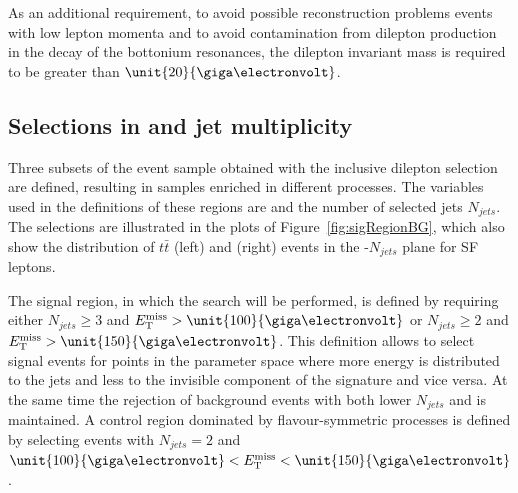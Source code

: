 As an additional requirement, to avoid possible reconstruction problems events with low lepton momenta and to avoid contamination from dilepton production in the decay of the bottonium resonances, the dilepton invariant mass \mll is required to be greater than $\unit{20}{\giga\electronvolt}$. 


\subsection{Selections in \MET and jet multiplicity}
\label{sec:regions}
Three subsets of the event sample obtained with the inclusive dilepton selection are defined, resulting in samples enriched in different processes. The variables used in the definitions of these regions are \MET and the number of selected jets $N_{jets}$. The selections are illustrated in the plots of Figure~\ref{fig:sigRegionBG}, which also show the distribution of $t\bar{t}$ (left) and \Zjets (right) events in the \MET-$N_{jets}$ plane for SF leptons. 
 
The signal region, in which the search will be performed, is defined by requiring either $N_{jets} \geq 3$ and $\MET > \unit{100}{\giga\electronvolt}$ or $N_{jets} \geq 2$ and $\MET > \unit{150}{\giga\electronvolt}$. This definition allows to select signal events for points in the parameter space where more energy is distributed to the jets and less to the invisible component of the signature and vice versa. At the same time the rejection of background events with both lower $N_{jets}$ and \MET is maintained. A control region dominated by flavour-symmetric processes is defined by selecting events with $N_{jets} = 2$ and $\unit{100}{\giga\electronvolt} < \MET < \unit{150}{\giga\electronvolt}$. 

